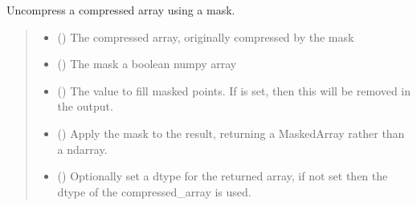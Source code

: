 \documentclass[letterpaper,10pt,english]{sphinxmanual}
\begin{document}
\begin{fulllineitems}
\label{\detokenize{misc:glomar_gridding.utils.uncompress_masked}}
\pysigstartsignatures
\pysiglinewithargsret
{}
{\sphinxparamcomma {}\sphinxparamcomma {}\sphinxparamcomma {}\sphinxparamcomma {}}
{}
\pysigstopsignatures
\sphinxAtStartPar
Un\sphinxhyphen{}compress a compressed array using a mask.
\begin{quote}\begin{description}
\begin{itemize}
\item {}
\sphinxAtStartPar
{} () \textendash{} The compressed array, originally compressed by the mask

\item {}
\sphinxAtStartPar
{} () \textendash{} The mask \sphinxhyphen{} a boolean numpy array

\item {}
\sphinxAtStartPar
{} () \textendash{} The value to fill masked points. If  is set, then this will
be removed in the output.

\item {}
\sphinxAtStartPar
{} () \textendash{} Apply the mask to the result, returning a MaskedArray rather than a
ndarray.

\item {}
\sphinxAtStartPar
{} (\sphinxstyleliteralemphasis{\sphinxupquote{ | }}) \textendash{} Optionally set a dtype for the returned array, if not set then the
dtype of the compressed\_array is used.


\end{itemize}
\end{description}
\end{quote}
\end{fulllineitems}
\end{document}
